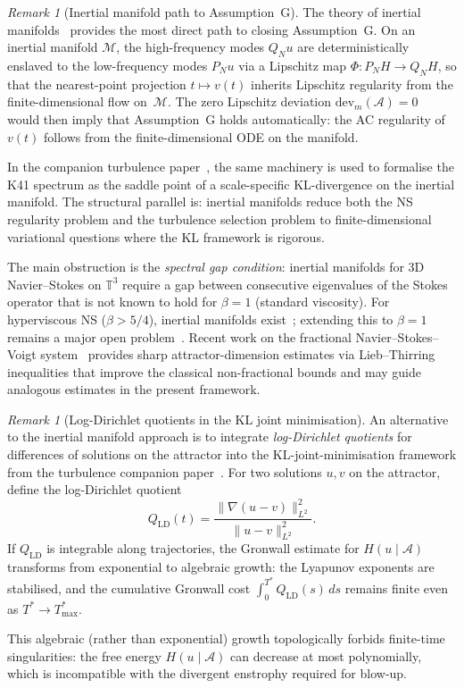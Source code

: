 \documentclass[12pt,a4paper]{article}
\theoremstyle{definition}
\theoremstyle{plain}
\theoremstyle{remark}
\newtheorem{remark}[definition]{Remark}
\begin{document}
\begin{remark}[Inertial manifold path to Assumption~G]
\label{rem:inertial-manifold-path}
The theory of inertial manifolds~\cite{FoiasSellTemam88} provides the most
direct path to closing Assumption~G\@. On an inertial manifold
$\mathcal{M}$, the high-frequency modes $Q_N u$ are deterministically
enslaved to the low-frequency modes $P_N u$ via a Lipschitz map
$\Phi \colon P_N H \to Q_N H$, so that the nearest-point projection
$t \mapsto v(t)$ inherits Lipschitz regularity from the finite-dimensional
flow on~$\mathcal{M}$. The zero Lipschitz deviation
$\mathrm{dev}_m(\mathcal{A}) = 0$~\cite{BaeCannone2016} would then
imply that Assumption~G holds automatically: the AC regularity of $v(t)$
follows from the finite-dimensional ODE on the manifold.

In the companion turbulence paper~\cite{FST-TU2026}, the same machinery
is used to formalise the K41 spectrum as the saddle point of a
scale-specific KL-divergence on the inertial manifold.
The structural parallel is: inertial manifolds reduce both the NS regularity
problem and the turbulence selection problem to finite-dimensional
variational questions where the KL framework is rigorous.

The main obstruction is the \emph{spectral gap condition}: inertial
manifolds for 3D Navier--Stokes on $\mathbb{T}^3$ require a gap between
consecutive eigenvalues of the Stokes operator that is not known to hold
for $\beta = 1$ (standard viscosity). For hyperviscous NS
($\beta > 5/4$), inertial manifolds
exist~\cite{EdenFoiasNicolaenko1994}; extending this to $\beta = 1$
remains a major open problem~\cite{Zelik2014}.
Recent work on the fractional Navier--Stokes--Voigt system~\cite{IlyinKalantarovZelik2025}
provides sharp attractor-dimension estimates via Lieb--Thirring inequalities
that improve the classical non-fractional bounds and may guide analogous
estimates in the present framework.
\end{remark}

\begin{remark}[Log-Dirichlet quotients in the KL joint minimisation]
\label{rem:log-dirichlet}
An alternative to the inertial manifold approach is to integrate
\emph{log-Dirichlet quotients} for differences of solutions on the
attractor into the KL-joint-minimisation framework from the turbulence
companion paper~\cite{FST-TU2026}. For two solutions $u, v$ on the
attractor, define the log-Dirichlet quotient
\[
  Q_{\mathrm{LD}}(t)
  = \frac{\|\nabla(u - v)\|_{L^2}^2}{\|u - v\|_{L^2}^2}.
\]
If $Q_{\mathrm{LD}}$ is integrable along trajectories, the Gronwall
estimate for $H(u \mid \mathcal{A})$ transforms from exponential to
algebraic growth: the Lyapunov exponents are stabilised, and the
cumulative Gronwall cost $\int_0^{T^*} Q_{\mathrm{LD}}(s)\, ds$
remains finite even as $T^* \to T^*_{\max}$.

This algebraic (rather than exponential) growth topologically forbids
finite-time singularities: the free energy $H(u \mid \mathcal{A})$
can decrease at most polynomially, which is incompatible with the
divergent enstrophy required for blow-up.
\end{remark}
\end{document}

